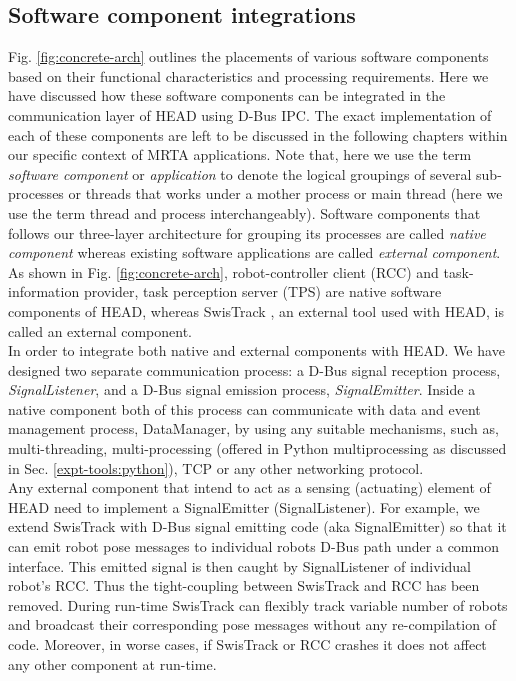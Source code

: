 \subsection{Software component integrations}
\label{expt-tools:arch:integration}
Fig. \ref{fig:concrete-arch} outlines the placements of various software components based on their functional characteristics and processing requirements. Here we have discussed how these  software components can be integrated in the communication layer of HEAD using D-Bus IPC. The exact implementation of each of these components are left to be discussed in the following chapters within our specific context of MRTA applications. Note that, here we use the term {\em software component} or {\em application} to denote the logical groupings of several sub-processes or threads that works under a mother process or main thread (here we use the term thread and process interchangeably). Software components that follows our three-layer architecture for grouping its processes are called {\em native component} whereas existing software applications are called {\em external component}. As shown in Fig. \ref{fig:concrete-arch}, robot-controller client (RCC) and task-information provider, task perception server (TPS) are native software components of HEAD, whereas SwisTrack \cite{Lochmatter+2008}, an external tool used with HEAD, is called an external component.\\
In order to integrate both native and external components with HEAD. We have designed two separate communication process: a D-Bus signal reception process, {\em SignalListener}, and a D-Bus signal emission process, {\em SignalEmitter}. Inside a native component both of this process can communicate with data and event management process, DataManager, by using any suitable mechanisms, such as, multi-threading, multi-processing (offered in Python multiprocessing as discussed in Sec. \ref{expt-tools:python}), TCP or any other networking protocol.\\
Any external component that intend to act as a sensing (actuating) element of HEAD need to implement a SignalEmitter (SignalListener). For example, we extend SwisTrack with D-Bus signal emitting code (aka SignalEmitter) so that it can emit robot pose messages to individual robots D-Bus path under a common interface.  This emitted signal is then caught by SignalListener of individual robot's RCC. Thus the tight-coupling between SwisTrack and RCC has been removed. During run-time SwisTrack can flexibly track variable number of robots and broadcast their corresponding pose messages without any re-compilation of code. Moreover, in worse cases, if SwisTrack or RCC crashes it does not affect any other component at run-time.\\
